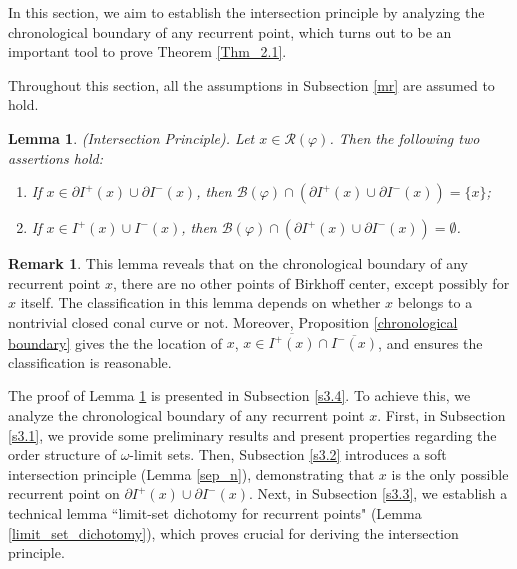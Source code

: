 \documentclass[a4paper,11pt]{article}
\theoremstyle{plain}
\newtheorem{lem}[thm]{Lemma}
\theoremstyle{definition}
\newtheorem{rmk}[thm]{Remark}
\numberwithin{equation}{section}
\begin{document}
   	In this section, we aim to establish the intersection principle by analyzing the chronological boundary of any recurrent point, which turns out to be an important tool to prove Theorem \ref{Thm_2.1}. 
    	
   	Throughout this section, all the assumptions in Subsection \ref{mr} are assumed to hold.


	\begin{lem}\label{endpoint}
		{\rm(Intersection Principle).}
		Let $x\in \mathcal{R}(\varphi)$. Then the following two assertions hold:
        \begin{enumerate}[{\rm (i)}]
			\item If $x\in \partial I^{+}(x)\cup \partial I^{-}(x)$, then $\mathcal{B}(\varphi)\cap (\partial  I^{+}(x)\cup \partial  I^{-}(x))=\{x\}$;
            
            \item If $x\in I^{+}(x)\cup I^{-}(x)$, then $\mathcal{B}(\varphi)\cap (\partial  I^{+}(x)\cup \partial  I^{-}(x))=\emptyset$.
        \end{enumerate}
	\end{lem}

    \begin{rmk}
    This lemma reveals that on the chronological boundary of any recurrent point $x$, there are no other points of Birkhoff center, except possibly for $x$ itself. 
    The classification in this lemma depends on whether $x$ belongs to a nontrivial closed conal curve or not. Moreover, Proposition \ref{chronological boundary} gives the the location of $x$, $x\in \overline{I^{+}(x)}\cap \overline{I^{-}(x)}$, and ensures the classification is reasonable.
    \end{rmk}
    
    
   	The proof of Lemma \ref{endpoint} is presented in Subsection \ref{s3.4}. To achieve this, we analyze the chronological boundary of any recurrent point $x$. First, in Subsection \ref{s3.1}, we provide some preliminary results and present properties regarding the order structure of $\omega$-limit sets. Then, Subsection \ref{s3.2} introduces a soft intersection principle (Lemma \ref{sep_n}), demonstrating that $x$ is the only possible recurrent point on $\partial I^{+}(x)\cup \partial I^{-}(x)$. Next, in Subsection \ref{s3.3}, we establish a technical lemma “limit-set dichotomy for recurrent points" (Lemma \ref{limit_set_dichotomy}), which proves crucial for deriving the intersection principle.

    
    
\end{document}
